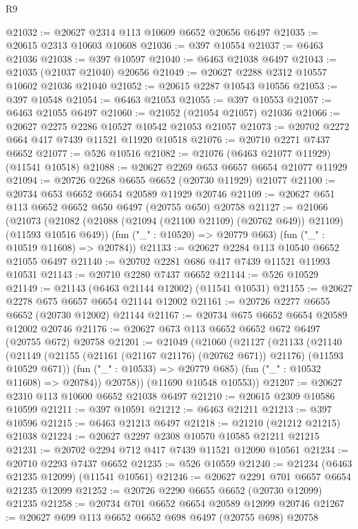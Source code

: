 \begin{lexlean}{R9}
\begin{coremodule}
{{{{{{{{{{{{{{{{{{{{{{{{{{{{{{{{{{{{{{{{{{{{{{{{{{{{{{{{{{{{{{{{{{{{{{{{{{{{{{{{{{{{@21032 := @20627 @2314 @113 @10609 @6652 @20656 @6497
@21035 := @20615 @2313 @10603 @10608
@21036 := @397 @10554
@21037 := @6463 @21036
@21038 := @397 @10597
@21040 := @6463 @21038 @6497
@21043 := @21035 (@21037 @21040) @20656
@21049 := @20627 @2288 @2312 @10557 @10602 @21036 @21040
@21052 := @20615 @2287 @10543 @10556
@21053 := @397 @10548
@21054 := @6463 @21053
@21055 := @397 @10553
@21057 := @6463 @21055 @6497
@21060 := @21052 (@21054 @21057) @21036
@21066 := @20627 @2275 @2286 @10527 @10542 @21053 @21057
@21073 := @20702 @2272 @664 @417 @7439 @11521 @11920 @10518
@21076 := @20710 @2271 @7437 @6652
@21077 := @526 @10516
@21082 := @21076 (@6463 @21077 @11929) (@11541 @10518)
@21088 := @20627 @2269 @653 @6657 @6654 @21077 @11929
@21094 := @20726 @2268 @6655 @6652 (@20730 @11929) @21077
@21100 := @20734 @653 @6652 @6654 @20589 @11929 @20746
@21109 := @20627 @651 @113 @6652 @6652 @650 @6497 (@20755 @650) @20758
@21127 := @21066
    (@21073
      (@21082 (@21088 (@21094 (@21100 @21109) (@20762 @649)) @21109) (@11593 @10516 @649))
      (fun ("_" : @10520) => @20779 @663)
      (fun ("_" : @10519 @11608) => @20784))
@21133 := @20627 @2284 @113 @10540 @6652 @21055 @6497
@21140 := @20702 @2281 @686 @417 @7439 @11521 @11993 @10531
@21143 := @20710 @2280 @7437 @6652
@21144 := @526 @10529
@21149 := @21143 (@6463 @21144 @12002) (@11541 @10531)
@21155 := @20627 @2278 @675 @6657 @6654 @21144 @12002
@21161 := @20726 @2277 @6655 @6652 (@20730 @12002) @21144
@21167 := @20734 @675 @6652 @6654 @20589 @12002 @20746
@21176 := @20627 @673 @113 @6652 @6652 @672 @6497 (@20755 @672) @20758
@21201 := @21049
    (@21060
      (@21127
        (@21133
          (@21140
            (@21149 (@21155 (@21161 (@21167 @21176) (@20762 @671)) @21176) (@11593 @10529 @671))
            (fun ("_" : @10533) => @20779 @685)
            (fun ("_" : @10532 @11608) => @20784))
          @20758))
      (@11690 @10548 @10553))
@21207 := @20627 @2310 @113 @10600 @6652 @21038 @6497
@21210 := @20615 @2309 @10586 @10599
@21211 := @397 @10591
@21212 := @6463 @21211
@21213 := @397 @10596
@21215 := @6463 @21213 @6497
@21218 := @21210 (@21212 @21215) @21038
@21224 := @20627 @2297 @2308 @10570 @10585 @21211 @21215
@21231 := @20702 @2294 @712 @417 @7439 @11521 @12090 @10561
@21234 := @20710 @2293 @7437 @6652
@21235 := @526 @10559
@21240 := @21234 (@6463 @21235 @12099) (@11541 @10561)
@21246 := @20627 @2291 @701 @6657 @6654 @21235 @12099
@21252 := @20726 @2290 @6655 @6652 (@20730 @12099) @21235
@21258 := @20734 @701 @6652 @6654 @20589 @12099 @20746
@21267 := @20627 @699 @113 @6652 @6652 @698 @6497 (@20755 @698) @20758
}}}}}}}}}}}}}}}}}}}}}}}}}}}}}}}}}}}}}}}}}}}}}}}}}}}}}}}}}}}}}}}}}}}}}}}}}}}}}}}}}}}}
\end{coremodule}
\end{lexlean}
